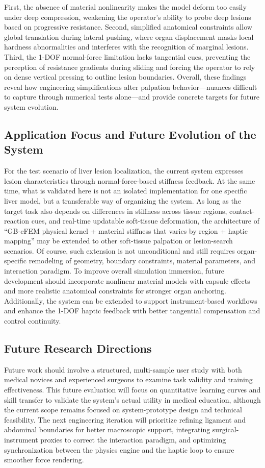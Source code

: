 \documentclass{ieeeaccess}
\begin{document}
First, the absence of material nonlinearity makes the model deform too easily under deep compression, weakening the operator's ability to probe deep lesions based on progressive resistance. Second, simplified anatomical constraints allow global translation during lateral pushing, where organ displacement masks local hardness abnormalities and interferes with the recognition of marginal lesions. Third, the 1-DOF normal-force limitation lacks tangential cues, preventing the perception of resistance gradients during sliding and forcing the operator to rely on dense vertical pressing to outline lesion boundaries. Overall, these findings reveal how engineering simplifications alter palpation behavior—nuances difficult to capture through numerical tests alone—and provide concrete targets for future system evolution.

\subsection{Application Focus and Future Evolution of the System}
For the test scenario of liver lesion localization, the current system expresses lesion characteristics through normal-force-based stiffness feedback. At the same time, what is validated here is not an isolated implementation for one specific liver model, but a transferable way of organizing the system. As long as the target task also depends on differences in stiffness across tissue regions, contact-reaction cues, and real-time updatable soft-tissue deformation, the architecture of ``GB-cFEM physical kernel + material stiffness that varies by region + haptic mapping'' may be extended to other soft-tissue palpation or lesion-search scenarios. Of course, such extension is not unconditional and still requires organ-specific remodeling of geometry, boundary constraints, material parameters, and interaction paradigm. To improve overall simulation immersion, future development should incorporate nonlinear material models with capsule effects and more realistic anatomical constraints for stronger organ anchoring. Additionally, the system can be extended to support instrument-based workflows and enhance the 1-DOF haptic feedback with better tangential compensation and control continuity.

\subsection{Future Research Directions}
Future work should involve a structured, multi-sample user study with both medical novices and experienced surgeons to examine task validity and training effectiveness. This future evaluation will focus on quantitative learning curves and skill transfer to validate the system's actual utility in medical education, although the current scope remains focused on system-prototype design and technical feasibility. The next engineering iteration will prioritize refining ligament and abdominal boundaries for better macroscopic support, integrating surgical-instrument proxies to correct the interaction paradigm, and optimizing synchronization between the physics engine and the haptic loop to ensure smoother force rendering.
\end{document}
